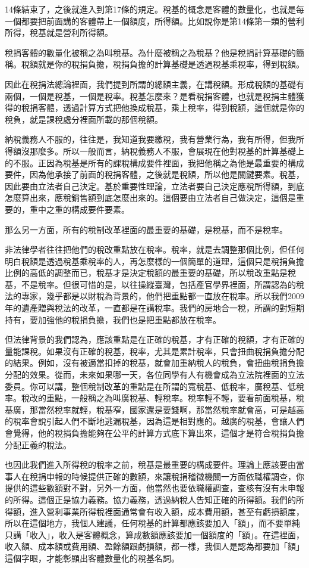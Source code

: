 \documentclass[]{ctexbook}
\begin{document}
14條結束了，之後就進入到第17條的規定。稅基的概念是客體的數量化，也就是每一個都要把前面講的客體帶上一個額度，所得額。比如說你是第14條第一類的營利所得，稅基就是營利所得額。

稅捐客體的數量化被稱之為叫稅基。為什麼被稱之為稅基？他是稅捐計算基礎的簡稱。稅額就是你的稅捐負擔，稅捐負擔的計算基礎是透過稅基乘稅率，得到稅額。

因此在稅捐法總論裡面，我們提到所謂的總額主義，在講稅額。形成稅額的基礎有兩個，一個是稅基，一個是稅率。稅基怎麼來？是看稅捐客體，也就是稅捐主體獲得的稅捐客體，透過計算方式把他換成稅基，乘上稅率，得到稅額，這個就是你的稅負，就是課稅處分裡面所載的那個稅額。

納稅義務人不服的，往往是，我知道我要繳稅，我有營業行為，我有所得，但我所得額沒那麼多。所以一般而言，納稅義務人不服，會展現在他對稅基的計算基礎上的不服。正因為稅基是所有的課稅構成要件裡面，我把他稱之為他是最重要的構成要件，因為他承接了前面的稅捐客體，之後就是稅額，所以他是關鍵要素。稅基，因此要由立法者自己決定。基於重要性理論，立法者要自己決定應稅所得額，到底怎麼算出來，應稅銷售額到底怎麼出來的。這個要由立法者自己做決定，這個是重要的，重中之重的構成要件要素。

那么另一方面，所有的稅制改革裡面的最重要的基礎，是稅基，而不是稅率。

非法律學者往往把他們的稅改重點放在稅率。稅率，就是去調整那個比例，但任何明白稅額是透過稅基乘稅率的人，再怎麼樣的一個簡單的道理，這個只是稅捐負擔比例的高低的調整而已，稅基才是決定稅額的最重要的基礎，所以稅改重點是稅基，不是稅率。但很可惜的是，以往操縱臺灣，包括產官學界裡面，所謂認為的稅法的專家，幾乎都是以財稅為背景的，他們把重點都一直放在稅率。所以我們2009年的遺產贈與稅法的改革，一直都是在講稅率。我們的房地合一稅，所謂的對短期持有，要加強他的稅捐負擔，我們也是把重點都放在稅率。

但法律背景的我們認為，應該重點是在正確的稅基，才有正確的稅額，才有正確的量能課稅。如果沒有正確的稅基，稅率，尤其是累計稅率，只會扭曲稅捐負擔分配的結果。例如，沒有被適當扣掉的稅基，就會加重納稅人的稅負，會扭曲稅捐負擔分配的效果。從而，未來如果哪一天，各位同學有人有機會成為立法院裡面的立法委員。你可以講，整個稅制改革的重點是在所謂的寬稅基、低稅率，廣稅基、低稅率。稅改的重點，一般稱之為叫廣稅基、輕稅率。稅率輕不輕，要看前面稅基，稅基廣，那當然稅率就輕，稅基窄，國家還是要錢啊，那當然稅率就會高，可是越高的稅率會說引起人們不斷地逃漏稅基，因為這是相對應的。越廣的稅基，會讓人們會覺得，他的稅捐負擔能夠在公平的計算方式底下算出來，這個才是符合稅捐負擔分配正義的稅法。

也因此我們進入所得稅的稅率之前，稅基是最重要的構成要件。理論上應該要由當事人在稅捐申報的時候提供正確的數額，來讓稅捐稽徵機關一方面依職權調查，你提供的這些數額對不對，另外一方面，他當然也要依職權調查，查核有沒有未申報的所得。這個正是協力義務。協力義務，透過納稅人告知正確的所得額。我們的所得額，進入營利事業所得稅裡面通常會有收入額，成本費用額，甚至有虧損額度，所以在這個地方，我個人建議，任何稅基的計算都應該要加入「額」，而不要單純只講「收入」，收入是客體概念，算成數額應該要加一個額度的「額」。在這裡面，收入額、成本額或費用額、盈餘額跟虧損額，都一樣，我個人是認為都要加「額」這個字眼，才能彰顯出客體數量化的稅基名詞。
\end{document}
